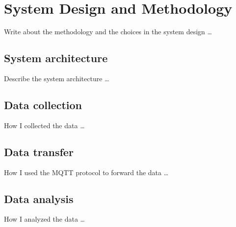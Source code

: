 \chapter{System Design and Methodology}
\label{cha:system}
\vspace{0.5 cm} 

Write about the methodology and the choices in the system design \dots


\vspace{0.5 cm} 
\section{System architecture}
\label{sec:sysarc}
\vspace{0.5 cm} 

Describe the system architecture \dots


\vspace{0.5 cm} 
\section{Data collection}
\label{sec:collection}
\vspace{0.5 cm} 

How I collected the data \dots


\vspace{0.5 cm} 
\section{Data transfer}
\label{sec:transfer}
\vspace{0.5 cm} 

How I used the MQTT protocol to forward the data \dots


\vspace{0.5 cm} 
\section{Data analysis}
\label{sec:analysis}
\vspace{0.5 cm} 

How I analyzed the data \dots
